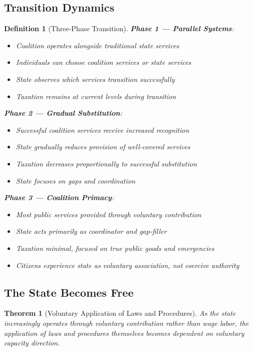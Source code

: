\documentclass[11pt]{article}
\newtheorem{definition}{Definition}
\newtheorem{theorem}{Theorem}
\begin{document}
\subsection{Transition Dynamics}

\begin{definition}[Three-Phase Transition]
\textbf{Phase 1 — Parallel Systems}:
\begin{itemize}
\item Coalition operates alongside traditional state services
\item Individuals can choose coalition services or state services
\item State observes which services transition successfully
\item Taxation remains at current levels during transition
\end{itemize}

\textbf{Phase 2 — Gradual Substitution}:
\begin{itemize}
\item Successful coalition services receive increased recognition
\item State gradually reduces provision of well-covered services
\item Taxation decreases proportionally to successful substitution
\item State focuses on gaps and coordination
\end{itemize}

\textbf{Phase 3 — Coalition Primacy}:
\begin{itemize}
\item Most public services provided through voluntary contribution
\item State acts primarily as coordinator and gap-filler
\item Taxation minimal, focused on true public goods and emergencies
\item Citizens experience state as voluntary association, not coercive authority
\end{itemize}
\end{definition}

\subsection{The State Becomes Free}

\begin{theorem}[Voluntary Application of Laws and Procedures]
As the state increasingly operates through voluntary contribution rather than wage labor, the application of laws and procedures themselves becomes dependent on voluntary capacity direction.
\end{theorem}
\end{document}
